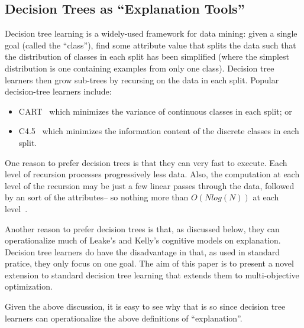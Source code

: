 \documentclass[runningheads]{llncs}
\newcommand{\bi}{\begin{itemize}}
\newcommand{\ei}{\end{itemize}}
\begin{document}
\subsection{Decision Trees as ``Explanation Tools''}
Decision tree learning is a widely-used framework for data mining: given a single goal
(called the ``class''), find some attribute value that splits the data such
that the distribution of classes in each split has been simplified
(where the simplest distribution is one containing examples from only one class).
Decision tree learners then grow sub-trees by recursing on the data in  each split. 
Popular decision-tree learners include:
\bi
\item CART~\cite{breiman84,} which  minimizes the variance of continuous classes in each split; or
\item C4.5~\cite{quinlan92} which minimizes the information content of the discrete classes in each split.
\ei
One reason to prefer decision trees is that they can very fast to
execute. Each level of recursion
processes progressively less data. Also, the computation at each level of the recursion
may be just a few linear passes through the data, followed by an
sort of the attributes-- so nothing more than $O(Nlog(N))$ at each level~\cite{witten11}.

Another reason to prefer decision trees is that, as discussed below, they
can operationalize much of Leake's and Kelly's
cognitive models on explanation.  Decision tree learners do have the disadvantage in that,
as used in standard pratice, they only focus on one goal. The aim of this
paper is to present a novel extension to standard decision tree learning that
extends them  to multi-objective optimization.

Given the above discussion, it is easy to see why that is so since decision
tree learners can operationalize the above definitions of ``explanation''.
\end{document}
